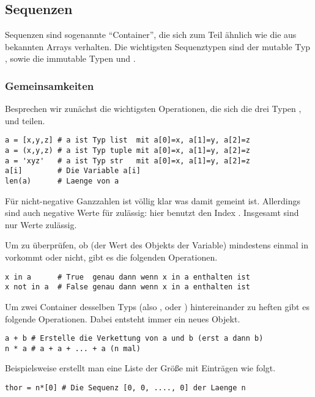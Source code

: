 \subsection{Sequenzen}
\label{section:std_data_types:sequenzen}
Sequenzen sind sogenannte ``Container'', die sich zum Teil ähnlich wie die aus \CC bekannten Arrays verhalten.
Die wichtigsten Sequenztypen sind der mutable Typ , sowie die immutable Typen  und .


\subsubsection{Gemeinsamkeiten}
\label{section:std_data_types:sequenzen:gemeinsamkeiten}
Besprechen wir zunächst die wichtigsten Operationen, die sich die drei Typen ,  und  teilen.
\begin{lstlisting}
a = [x,y,z] # a ist Typ list  mit a[0]=x, a[1]=y, a[2]=z
a = (x,y,z) # a ist Typ tuple mit a[0]=x, a[1]=y, a[2]=z
a = 'xyz'   # a ist Typ str   mit a[0]=x, a[1]=y, a[2]=z
a[i]        # Die Variable a[i]
len(a)      # Laenge von a
\end{lstlisting}
Für nicht-negative Ganzzahlen  ist völlig klar was damit gemeint ist.
Allerdings sind auch negative Werte für  zulässig: hier benutzt \Python den Index .
Insgesamt sind nur Werte  zulässig.

Um zu überprüfen, ob (der Wert des Objekts der Variable)  mindestens einmal in  vorkommt oder nicht, gibt es die folgenden Operationen.
\begin{lstlisting}
x in a      # True  genau dann wenn x in a enthalten ist
x not in a  # False genau dann wenn x in a enthalten ist
\end{lstlisting}

Um zwei Container desselben Typs (also ,  oder ) hintereinander zu heften gibt es folgende Operationen.
Dabei entsteht immer ein neues Objekt.
\begin{lstlisting}
a + b # Erstelle die Verkettung von a und b (erst a dann b)
n * a # a + a + ... + a (n mal)
\end{lstlisting}
Beispielsweise erstellt man eine Liste der Größe  mit Einträgen  wie folgt.
\begin{lstlisting}
thor = n*[0] # Die Sequenz [0, 0, ...., 0] der Laenge n
\end{lstlisting}

